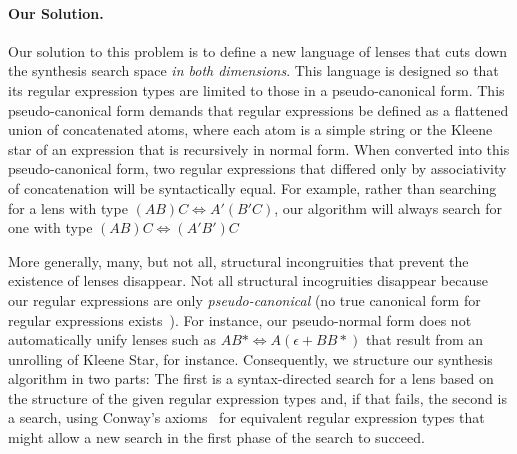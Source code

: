 
\paragraph*{Our Solution.}  Our solution to this problem is to define
a new language of lenses that
cuts down the synthesis search space \emph{in both dimensions}.  
This language is designed so that its regular expression types are limited 
to those in a pseudo-canonical form.  This pseudo-canonical form
demands that regular expressions be defined as a flattened 
union of concatenated atoms, where each atom is a simple string or
the Kleene star of an expression that is recursively in normal form.
When converted into this pseudo-canonical form, two regular expressions that 
differed only by associativity of concatenation will be syntactically equal.
For example, rather than searching for a lens with type 
 $(A B) C \Leftrightarrow A' (B' C)$, our algorithm will always search
for one with type  $(A B) C \Leftrightarrow (A' B') C$
  
More generally, many, but not all, structural incongruities that
prevent the existence of lenses disappear.
Not all structural incogruities disappear because our regular expressions
are only \emph{pseudo-canonical} (no true canonical form for regular
expressions exists~\cite{?}).  For instance, our pseudo-normal form
does not automatically unify lenses such as
$A B* \Leftrightarrow A (\epsilon + BB*)$ that result from an
unrolling of Kleene Star, for instance.
Consequently, we structure our synthesis algorithm in two parts:  The
first is a syntax-directed search for a lens based on the structure of the given
regular expression types and, if that fails, the second is a search,
using Conway's axioms~\cite{conway} for 
equivalent regular expression types that might allow a new search
in the first phase of the search to succeed.  


